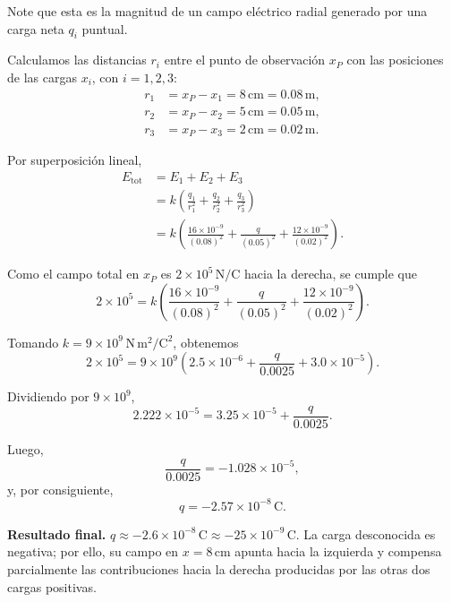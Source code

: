 \documentclass[11pt]{article}
\newcommand{\resultadofinal}[1]{%
  \par\medskip
  \noindent\textbf{Resultado final.} #1\par
}
\begin{document}
Note que esta es la magnitud de un campo eléctrico radial generado por una carga neta $q_i$ puntual.

Calculamos las distancias $r_i$ entre el punto de observación $x_P$ con las posiciones de las cargas $x_i$, con $i=1,2,3$:
\begin{align*}
    r_1&=x_P-x_1=8\,\mathrm{cm}=0.08\,\mathrm{m},\\
    r_2&=x_P-x_2=5\,\mathrm{cm}=0.05\,\mathrm{m},\\
    r_3&=x_P-x_3=2\,\mathrm{cm}=0.02\,\mathrm{m}.
\end{align*}

Por superposición lineal,
\begin{align*}
E_{\mathrm{tot}}
&=E_1+E_2+E_3\\
&=k\left(\frac{q_1}{r_1^2}+\frac{q_2}{r_2^2}+\frac{q_3}{r_3^2}\right)\\
&=k\left(\frac{16\times10^{-9}}{(0.08)^2}+\frac{q}{(0.05)^2}+\frac{12\times10^{-9}}{(0.02)^2}\right).
\end{align*}

Como el campo total en $x_P$ es $2\times 10^5\,\mathrm{N/C}$ hacia la derecha, se cumple que
\begin{equation*}
2\times 10^5
=
k\left(\frac{16\times 10^{-9}}{(0.08)^2}+\frac{q}{(0.05)^2}+\frac{12\times 10^{-9}}{(0.02)^2}\right).
\end{equation*}

Tomando $k=9\times 10^9\,\mathrm{N\,m^2/C^2}$, obtenemos
\begin{equation*}
2\times 10^5
=
9\times 10^9\left(2.5\times 10^{-6}+\frac{q}{0.0025}+3.0\times 10^{-5}\right).
\end{equation*}

Dividiendo por $9\times 10^9$,
\begin{equation*}
2.222\times 10^{-5}=3.25\times 10^{-5}+\frac{q}{0.0025}.
\end{equation*}

Luego,
\begin{equation*}
\frac{q}{0.0025}=-1.028\times 10^{-5},
\end{equation*}
y, por consiguiente,
\begin{equation*}
q=-2.57\times 10^{-8}\,\mathrm{C}.
\end{equation*}

\resultadofinal{$\boxed{q\approx -2.6\times 10^{-8}\,\mathrm{C}\approx -25\times10^{-9}\,\mathrm{C}.}$ La carga desconocida es negativa; por ello, su campo en $x=8\,\mathrm{cm}$ apunta hacia la izquierda y compensa parcialmente las contribuciones hacia la derecha producidas por las otras dos cargas positivas.}
\end{document}
